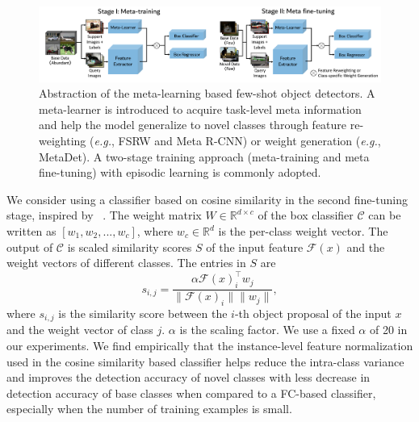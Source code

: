 \begin{figure}[ht]
    \centering
    \includegraphics[width=\linewidth]{figs/TFA_fig2.pdf}
    \vspace{-8mm}
    \caption{Abstraction of the meta-learning based few-shot object detectors. A meta-learner is introduced to acquire task-level meta information and help the model generalize to novel classes through feature re-weighting (\textit{e.g.}, FSRW and Meta R-CNN) or weight generation (\textit{e.g.}, MetaDet). A two-stage training approach (meta-training and meta fine-tuning) with episodic learning is commonly adopted.}
    \label{fig:meta_arch}
\end{figure}

 We consider using a classifier based on cosine similarity in the second fine-tuning stage, inspired by ~\citet{gidaris2018dynamic,qi2018low,chen2019closer}. The weight matrix $W\in\mathbb{R}^{d\times c}$ of the box classifier $\mathcal{C}$ can be written as $[w_1, w_2, ..., w_c]$, where $w_c\in\mathbb{R}^d$ is the per-class weight vector. The output of $\mathcal{C}$ is scaled similarity scores $S$ of the input feature $\mathcal{F}(x)$ and the weight vectors of different classes. The entries in $S$ are 
\begin{equation}
    s_{i,j} = \frac{\alpha \mathcal{F}(x)_i^\top w_j}{\|\mathcal{F}(x)_i\| \|w_j\|}, 
\end{equation}
where $s_{i,j}$ is the similarity score between the $i$-th object proposal of the input $x$ and the weight vector of class $j$. $\alpha$ is the scaling factor. We use a fixed $\alpha$ of 20 in our experiments. We find empirically that the instance-level feature 
normalization used in the cosine similarity based classifier helps reduce the intra-class
variance and improves the detection accuracy of novel classes with less decrease in detection accuracy of base classes when compared to a FC-based classifier, especially when the number of training examples is small.

